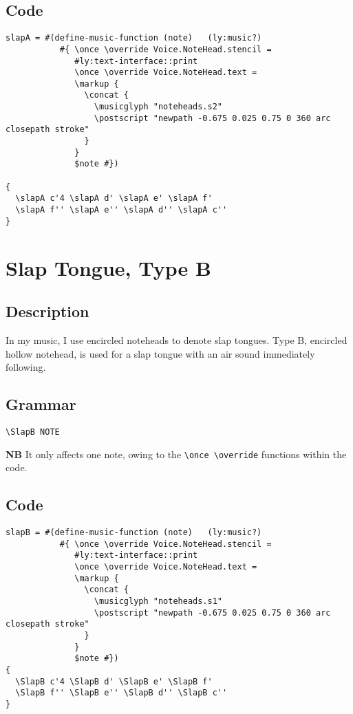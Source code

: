\documentclass[11pt, oneside]{book}   	%
\begin{document}
\subsection{Code}
\begin{verbatim}
slapA = #(define-music-function (note)   (ly:music?)
           #{ \once \override Voice.NoteHead.stencil =
              #ly:text-interface::print
              \once \override Voice.NoteHead.text =
              \markup {
                \concat {
                  \musicglyph "noteheads.s2"
                  \postscript "newpath -0.675 0.025 0.75 0 360 arc closepath stroke"
                }
              }
              $note #})

{
  \slapA c'4 \slapA d' \slapA e' \slapA f'
  \slapA f'' \slapA e'' \slapA d'' \slapA c''
}
\end{verbatim}
\vfill \break


\section {Slap Tongue, Type B}
\hfill
\subsection{Description}
In my music, I use encircled noteheads to denote slap tongues. Type B, encircled hollow notehead, is used for a slap tongue with an air sound immediately following.  

\subsection{Grammar}
\begin{verbatim}
\SlapB NOTE
\end{verbatim}
\textbf{NB} It only affects one note, owing to the \verb|\once \override| functions within the code.
\subsection{Code}
\begin{verbatim}
slapB = #(define-music-function (note)   (ly:music?)
           #{ \once \override Voice.NoteHead.stencil =
              #ly:text-interface::print
              \once \override Voice.NoteHead.text =
              \markup {
                \concat {
                  \musicglyph "noteheads.s1"
                  \postscript "newpath -0.675 0.025 0.75 0 360 arc closepath stroke"
                }
              }
              $note #})
{
  \SlapB c'4 \SlapB d' \SlapB e' \SlapB f'
  \SlapB f'' \SlapB e'' \SlapB d'' \SlapB c''
}

\end{verbatim}
\end{document}
